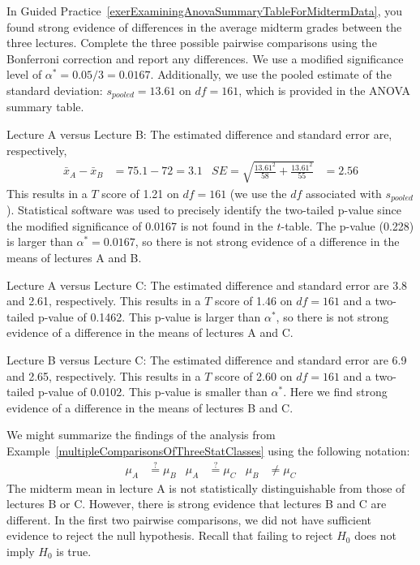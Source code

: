 \begin{example}{In Guided Practice~\ref{exerExaminingAnovaSummaryTableForMidtermData}, you found strong evidence of differences in the average midterm grades between the three lectures. Complete the three possible pairwise comparisons using the Bonferroni correction and report any differences.} \label{multipleComparisonsOfThreeStatClasses}
We use a modified significance level of $\alpha^* = 0.05/3 = 0.0167$. Additionally, we use the pooled estimate of the standard deviation: $s_{pooled}=13.61$ on $df=161$, which is provided in the ANOVA summary table.

Lecture A versus Lecture B: The estimated difference and standard error are, respectively,
\begin{align*}
\bar{x}_A - \bar{x}_{B} &= 75.1 - 72 = 3.1
	&SE = \sqrt{\frac{13.61^2}{58} + \frac{13.61^2}{55}} &= 2.56
\end{align*}
This results in a $T$ score of 1.21 on $df = 161$ (we use the $df$ associated with $s_{pooled}$). Statistical software was used to precisely identify the two-tailed p-value since the modified significance of 0.0167 is not found in the $t$-table. The p-value (0.228) is larger than $\alpha^*=0.0167$, so there is not strong evidence of a difference in the means of lectures A and B.

Lecture A versus Lecture C: The estimated difference and standard error are 3.8 and 2.61, respectively. This results in a $T$ score of 1.46 on $df = 161$ and a two-tailed p-value of 0.1462. This p-value is larger than $\alpha^*$, so there is not strong evidence of a difference in the means of lectures A and C.

Lecture B versus Lecture C: The estimated difference and standard error are 6.9 and 2.65, respectively. This results in a $T$ score of 2.60 on $df = 161$ and a two-tailed p-value of 0.0102. This p-value is smaller than $\alpha^*$. Here we find strong evidence of a difference in the means of lectures B and C.
\end{example}

\textA{\newpage}

We might summarize the findings of the analysis from Example~\ref{multipleComparisonsOfThreeStatClasses} using the following notation:
\begin{align*}
\mu_A &\stackrel{?}{=} \mu_B
	&\mu_A &\stackrel{?}{=} \mu_C
	&\mu_B &\neq \mu_C
\end{align*}
The midterm mean in lecture A is not statistically distinguishable from those of lectures B or C. However, there is strong evidence that lectures B and C are different. In the first two pairwise comparisons, we did not have sufficient evidence to reject the null hypothesis. Recall that failing to reject $H_0$ does not imply $H_0$ is true.


